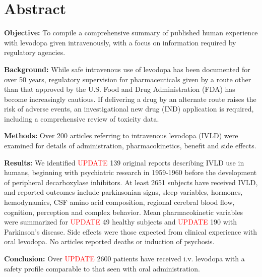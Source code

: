\section{Abstract}
\textbf{Objective:} To compile a comprehensive summary of published human experience with levodopa given intravenously, with a focus on information required by regulatory agencies.

\textbf{Background:} While safe intravenous use of levodopa has been documented for over 50 years, regulatory supervision for pharmaceuticals given by a route other than that approved by the U.S. Food and Drug Administration (FDA) has become increasingly cautious. If delivering a drug by an alternate route raises the risk of adverse events, an investigational new drug (IND) application is required, including a comprehensive review of toxicity data.

\textbf{Methods:} Over 200 articles referring to intravenous levodopa (IVLD) were examined for details of administration, pharmacokinetics, benefit and side effects.

\textbf{Results:} We identified \textcolor{red}{UPDATE} 139 original reports describing IVLD use in humans, beginning with psychiatric research in 1959-1960 before the development of peripheral decarboxylase inhibitors. At least 2651 subjects have received IVLD, and reported outcomes include parkinsonian signs, sleep variables, hormones, hemodynamics, CSF amino acid composition, regional cerebral blood ﬂow, cognition, perception and complex behavior. Mean pharmacokinetic variables were summarized for \textcolor{red}{UPDATE} 49 healthy subjects and \textcolor{red}{UPDATE} 190 with Parkinson's disease. Side effects were those expected from clinical experience with oral levodopa. No articles reported deaths or induction of psychosis.

\textbf{Conclusion:} Over \textcolor{red}{UPDATE} 2600 patients have received i.v. levodopa with a safety profile comparable to that seen with oral administration.